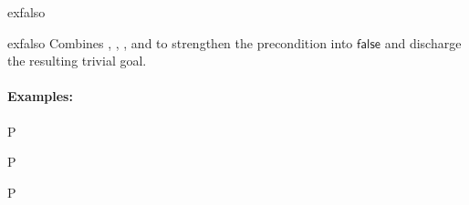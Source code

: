 \begin{tactic}{exfalso}
  \begin{tsyntax}{exfalso}
  Combines , , ,
   and  to strengthen the precondition
  into $\mathsf{false}$ and discharge the resulting trivial goal.

  \paragraph{Examples:}\strut
  
  \begin{cmathpar}
    {P \Rightarrow {}}
    {}

    {P \Rightarrow {}}
    {}

    {P \Rightarrow {}}
    {}
  \end{cmathpar}
  \end{tsyntax}
\end{tactic}
